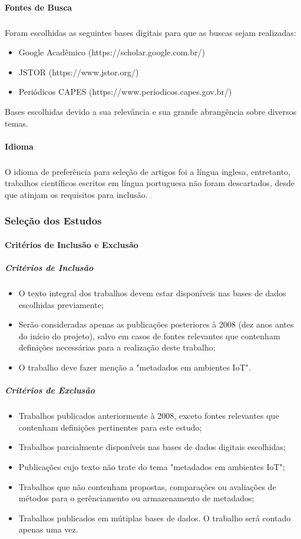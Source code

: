 \paragraph{Fontes de Busca}
\subparagraph{}
 Foram escolhidas as seguintes bases digitais para que as buscas sejam realizadas:
\begin{itemize}
  \item Google Acadêmico (https://scholar.google.com.br/)
  \item JSTOR (https://www.jstor.org/)
  \item Periódicos CAPES (https://www.periodicos.capes.gov.br/)
\end{itemize}
\quad Bases escolhidas devido a sua relevância e sua grande abrangência sobre diversos temas.

\paragraph{Idioma}
\subparagraph{}
\quad O idioma de preferência para seleção de artigos foi a língua inglesa, entretanto, trabalhos científicos escritos em
língua portuguesa não foram descartados, desde que atinjam os requisitos para inclusão.

\subsubsection{Seleção dos Estudos}
\paragraph{Critérios de Inclusão e Exclusão}
\subparagraph{Critérios de Inclusão}
\begin{itemize}
  \item O texto integral dos trabalhos devem estar disponíveis nas bases de dados escolhidas previamente;
  \item Serão consideradas apenas as publicações posteriores à 2008 (dez anos antes do início do projeto), salvo em casos de fontes relevantes que contenham definições necessárias para a realização deste trabalho;
  \item O trabalho deve fazer menção a "metadados em ambientes \acrlong{IoT}".
\end{itemize}

\subparagraph{Critérios de Exclusão}
\begin{itemize}
  \item Trabalhos publicados anteriormente à 2008, exceto fontes relevantes que contenham definições pertinentes para este estudo;
  \item Trabalhos parcialmente disponíveis nas bases de dados digitais escolhidas;
  \item Publicações cujo texto não trate do tema "metadados em ambientes \acrshort{IoT}";
  \item Trabalhos que não contenham propostas, comparações ou avaliações de métodos para o gerênciamento ou armazenamento de metadados;
  \item Trabalhos publicados em mútiplas bases de dados. O trabalho será contado apenas uma vez.
\end{itemize}

